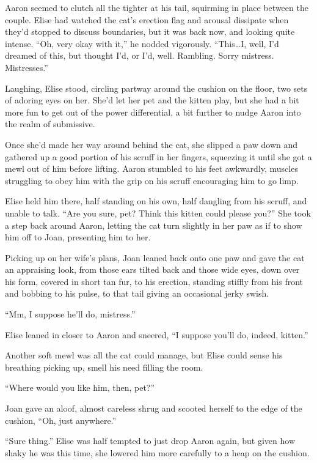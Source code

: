 Aaron seemed to clutch all the tighter at his tail, squirming in place
between the couple. Elise had watched the cat's erection flag and
arousal dissipate when they'd stopped to discuss boundaries, but it was
back now, and looking quite intense. ``Oh, very okay with it,'' he
nodded vigorously. ``This\ldots{}I, well, I'd dreamed of this, but
thought I'd, or I'd, well. Rambling. Sorry mistress. Mistresses.''

Laughing, Elise stood, circling partway around the cushion on the floor,
two sets of adoring eyes on her. She'd let her pet and the kitten play,
but she had a bit more fun to get out of the power differential, a bit
further to nudge Aaron into the realm of submissive.

Once she'd made her way around behind the cat, she slipped a paw down
and gathered up a good portion of his scruff in her fingers, squeezing
it until she got a mewl out of him before lifting. Aaron stumbled to his
feet awkwardly, muscles struggling to obey him with the grip on his
scruff encouraging him to go limp.

Elise held him there, half standing on his own, half dangling from his
scruff, and unable to talk. ``Are you sure, pet? Think this kitten could
please you?'' She took a step back around Aaron, letting the cat turn
slightly in her paw as if to show him off to Joan, presenting him to
her.

Picking up on her wife's plans, Joan leaned back onto one paw and gave
the cat an appraising look, from those ears tilted back and those wide
eyes, down over his form, covered in short tan fur, to his erection,
standing stiffly from his front and bobbing to his pulse, to that tail
giving an occasional jerky swish.

``Mm, I suppose he'll do, mistress.''

Elise leaned in closer to Aaron and sneered, ``I suppose you'll do,
indeed, kitten.''

Another soft mewl was all the cat could manage, but Elise could sense
his breathing picking up, smell his need filling the room.

``Where would you like him, then, pet?''

Joan gave an aloof, almost careless shrug and scooted herself to the
edge of the cushion, ``Oh, just anywhere.''

``Sure thing.'' Elise was half tempted to just drop Aaron again, but
given how shaky he was this time, she lowered him more carefully to a
heap on the cushion.

